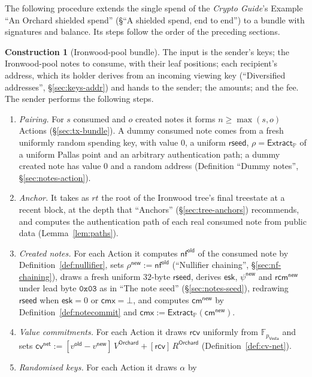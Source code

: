 \documentclass[11pt,a4paper]{article}
\theoremstyle{definition}
\newtheorem{construction}[theorem]{Construction}
\newcommand{\F}{\mathbb{F}}
\newcommand{\PP}{\mathbb{P}}
\newcommand{\nfsym}{\mathsf{nf}}
\newcommand{\cmsym}{\mathsf{cm}}
\newcommand{\cmx}{\mathsf{cmx}}
\newcommand{\cvsym}{\mathsf{cv}}
\newcommand{\Vesta}{\ensuremath{\mathsf{Vesta}}}
\newcommand{\Extract}{\ensuremath{\mathsf{Extract}}}
\newcommand{\rcv}{\ensuremath{\mathsf{rcv}}}
\newcommand{\rcm}{\ensuremath{\mathsf{rcm}}}
\begin{document}
The following procedure extends the single spend of the \emph{Crypto
Guide}'s Example ``An Orchard shielded spend'' (\S``A shielded spend, end to
end'') to a bundle with signatures and balance. Its steps follow the order
of the preceding sections.

\begin{construction}[Ironwood-pool bundle]
The input is the sender's keys; the Ironwood-pool notes to consume, with
their leaf positions; each recipient's address, which its holder derives
from an incoming viewing key (``Diversified addresses'',
\S\ref{sec:keys-addr}) and hands to the sender; the amounts; and the fee.
The sender performs the following steps.
\begin{enumerate}[label=(\arabic*)]
\item \emph{Pairing.} For $s$ consumed and $o$ created notes it forms
  $n \ge \max(s, o)$ Actions (\S\ref{sec:tx-bundle}). A dummy consumed note
  comes from a fresh uniformly random spending key, with value $0$, a
  uniform $\mathsf{rseed}$, $\rho = \Extract_{\PP}$ of a uniform Pallas
  point and an arbitrary authentication path; a dummy created note has
  value $0$ and a random address (Definition ``Dummy notes'',
  \S\ref{sec:notes-action}).
\item \emph{Anchor.} It takes as $\mathit{rt}$ the root of the Ironwood
  tree's final treestate at a recent block, at the depth that ``Anchors''
  (\S\ref{sec:tree-anchors}) recommends, and computes the authentication
  path of each real consumed note from public data
  (Lemma~\ref{lem:paths}).
\item \emph{Created notes.} For each Action it computes $\nfsym^{\mathsf{old}}$
  of the consumed note by Definition~\ref{def:nullifier}, sets
  $\rho^{\mathsf{new}} := \nfsym^{\mathsf{old}}$ (``Nullifier chaining'',
  \S\ref{sec:nf-chaining}), draws a fresh uniform $32$-byte
  $\mathsf{rseed}$, derives $\mathsf{esk}$, $\psi^{\mathsf{new}}$ and
  $\rcm^{\mathsf{new}}$ under lead byte $\mathtt{0x03}$ as in ``The note
  seed'' (\S\ref{sec:notes-seed}), redrawing $\mathsf{rseed}$ when
  $\mathsf{esk} = 0$ or $\cmx = \bot$, and computes $\cmsym^{\mathsf{new}}$
  by Definition~\ref{def:notecommit} and
  $\cmx := \Extract_{\PP}(\cmsym^{\mathsf{new}})$.
\item \emph{Value commitments.} For each Action it draws $\rcv$ uniformly
  from $\F_{p_{\Vesta}}$ and sets
  $\cvsym^{\mathsf{net}} := [v^{\mathsf{old}} - v^{\mathsf{new}}]\,
  V^{\mathsf{Orchard}} + [\rcv]\,R^{\mathsf{Orchard}}$
  (Definition~\ref{def:cv-net}).
\item \emph{Randomised keys.} For each Action it draws $\alpha$ by

\end{enumerate}
\end{construction}
\end{document}
